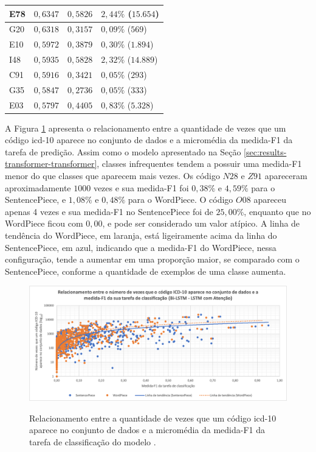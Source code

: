 \begin{table}[ht!]
\begin{tabular}{
        >{\centering\arraybackslash}m{} | >{\centering\arraybackslash}m{} | >{\centering\arraybackslash}m{} | >{\centering\arraybackslash}m{}}
        \hline
        E78 & $0,6347$ & $0,5826$ & $2,44\%$ ($15.654$) \\
        \hline
        G20 & $0,6318$ & $0,3157$ & $0,09\%$ ($569$) \\
        \hline
        E10 & $0,5972$ & $0,3879$ & $0,30\%$ ($1.894$) \\
        \hline
        I48 & $0,5935$ & $0,5828$ & $2,32\%$ ($14.889$) \\
        \hline
        C91 & $0,5916$ & $0,3421$ & $0,05\%$ ($293$) \\
        \hline
        G35 & $0,5847$ & $0,2736$ & $0,05\%$ ($333$) \\
        \hline
        E03 & $0,5797$ & $0,4405$ & $0,83\%$ ($5.328$) \\
        \hline
    \end{tabular}
\end{table}

A Figura \ref{fig:result_appears_vs_f1_lstm_lstm} apresenta o relacionamento entre a quantidade de vezes que um código \gls{icd}-10 aparece no conjunto de dados e a micromédia da medida-F1 da tarefa de predição. Assim como o modelo \xfmrxfmr{} apresentado na Seção \ref{sec:results-transformer-transformer}, classes infrequentes tendem a possuir uma medida-F1 menor do que classes que aparecem mais vezes. Os código $N28$ e $Z91$ apareceram aproximadamente $1000$ vezes e sua medida-F1 foi $0,38\%$ e $4,59\%$ para o SentencePiece, e $1,08\%$ e $0,48\%$ para o WordPiece. O código $O08$ apareceu apenas 4 vezes e sua medida-F1 no SentencePiece foi de $25,00\%$, enquanto que no WordPiece ficou com $0,00$, e pode ser considerado um valor atípico. A linha de tendência do WordPiece, em laranja, está ligeiramente acima da linha do SentencePiece, em azul, indicando que a medida-F1 do WordPiece, nessa configuração, tende a aumentar em uma proporção maior, se comparado com o SentencePiece, conforme a quantidade de exemplos de uma classe aumenta.
\begin{figure}[htbp]
    \centering
        \caption{Relacionamento entre a quantidade de vezes que um código \gls{icd}-10 aparece no conjunto de dados e a micromédia da medida-F1 da tarefa de classificação do modelo \lstmlstm{}.}
        \includegraphics[width=\textwidth]{resources/images/results/result_appears_vs_f1_lstm_lstm_log_ptbr.png}
        \label{fig:result_appears_vs_f1_lstm_lstm}
\end{figure}

